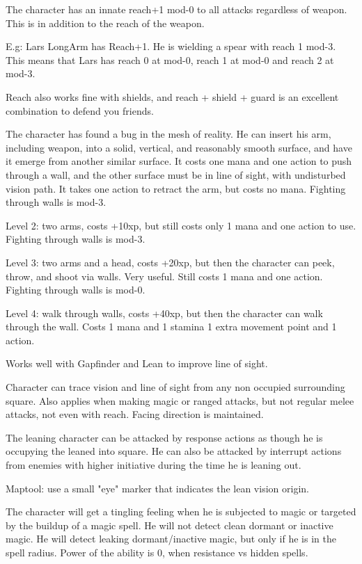  The character has an innate reach+1 mod-0 to all attacks regardless of weapon. This is in addition to the reach of the weapon.

E.g: Lars LongArm has Reach+1. He is wielding a spear with reach 1 mod-3. This means that Lars has reach 0 at mod-0, reach 1 at mod-0 and reach 2 at mod-3.

Reach also works fine with shields, and reach + shield + guard is an excellent combination to defend you friends.


 The character has found a bug in the mesh of reality. He can insert his arm, including weapon, into a solid, vertical, and reasonably smooth surface, and have it emerge from another similar surface. It costs one mana and one action to push through a wall, and the other surface must be in line of sight, with undisturbed vision path. It takes one action to retract the arm, but costs no mana. Fighting through walls is mod-3.

Level 2: two arms, costs +10xp, but still costs only 1 mana and one action to use. Fighting through walls is mod-3.

Level 3: two arms and a head, costs +20xp, but then the character can peek, throw, and shoot via walls. Very useful. Still costs 1 mana and one action. Fighting through walls is mod-0.

Level 4: walk through walls, costs +40xp, but then the character can walk through the wall. Costs 1 mana and 1 stamina 1 extra movement point and 1 action.

Works well with Gapfinder and Lean to improve line of sight.


 Character can trace vision and line of sight from any non occupied surrounding square. Also applies when making magic or ranged attacks, but not regular melee attacks, not even with reach. Facing direction is maintained.

The leaning character can be attacked by response actions as though he is occupying the leaned into square. He can also be attacked by interrupt actions from enemies with higher initiative during the time he is leaning out.

Maptool: use a small "eye" marker that indicates the lean vision origin.


 The character will get a tingling feeling when he is subjected to magic or targeted by the buildup of a magic spell. He will not detect clean dormant or inactive magic. He will detect leaking dormant/inactive magic, but only if he is in the spell radius.
Power of the ability is 0, when resistance vs hidden spells.

